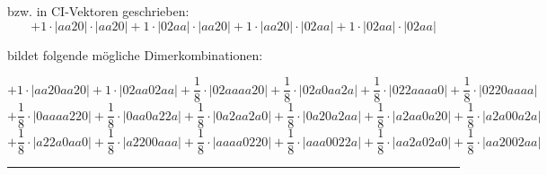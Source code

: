 \documentclass{article}
\begin{document}
\begin{minipage}{\linewidth}
bzw. in CI-Vektoren geschrieben: 
 $$+ 1 \cdot \left|aa20 \right| \cdot \left| aa20 \right| 
+ 1 \cdot \left|02aa \right| \cdot \left| aa20 \right| 
+ 1 \cdot \left|aa20 \right| \cdot \left| 02aa \right| 
+ 1 \cdot \left|02aa \right| \cdot \left| 02aa \right| 
$$



 bildet folgende mögliche Dimerkombinationen:

$$+ 1 \cdot \left|aa20aa20 \right| + 1 \cdot \left|02aa02aa \right| + \frac{1}{8} \cdot \left|02aaaa20 \right| + \frac{1}{8} \cdot \left|02a0aa2a \right| + \frac{1}{8} \cdot \left|022aaaa0 \right| + \frac{1}{8} \cdot \left|0220aaaa \right|  $$ $$ + \frac{1}{8} \cdot \left|0aaaa220 \right| + \frac{1}{8} \cdot \left|0aa0a22a \right| + \frac{1}{8} \cdot \left|0a2aa2a0 \right| + \frac{1}{8} \cdot \left|0a20a2aa \right| + \frac{1}{8} \cdot \left|a2aa0a20 \right| + \frac{1}{8} \cdot \left|a2a00a2a \right|  $$ $$ + \frac{1}{8} \cdot \left|a22a0aa0 \right| + \frac{1}{8} \cdot \left|a2200aaa \right| + \frac{1}{8} \cdot \left|aaaa0220 \right| + \frac{1}{8} \cdot \left|aaa0022a \right| + \frac{1}{8} \cdot \left|aa2a02a0 \right| + \frac{1}{8} \cdot \left|aa2002aa \right| $$



\end{minipage}
\vspace{0.5cm}
\hrule
\vspace{0.5cm}
\end{document}
